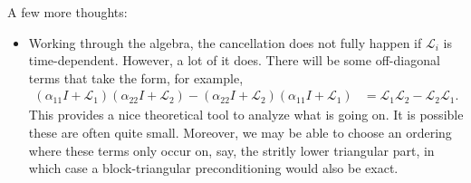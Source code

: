 \documentclass[a4paper,10pt]{article}
\begin{document}
%
{\color{blue}A few more thoughts:
\begin{itemize}
\item Working through the algebra, the cancellation does not fully happen if $\mathcal{L}_i$
is time-dependent. However, a lot of it does. There will be some off-diagonal terms that take
the form, for example,
%
\begin{align*}
(\alpha_{11}I + \mathcal{L}_1)(\alpha_{22}I + \mathcal{L}_2) - 
	(\alpha_{22}I + \mathcal{L}_2)(\alpha_{11}I + \mathcal{L}_1)
& = \mathcal{L}_1\mathcal{L}_2 - \mathcal{L}_2\mathcal{L}_1.
\end{align*}
%
This provides a nice theoretical tool to analyze what is going on. It is possible these are often
quite small. Moreover, we may be able to choose an ordering where these terms only occur on,
say, the stritly lower triangular part, in which case a block-triangular preconditioning would also
be exact. 

\end{itemize}
}
%
\end{document}
